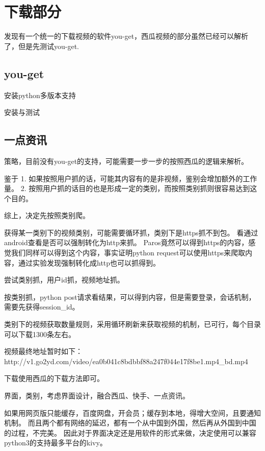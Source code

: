 \documentclass[11pt]{article}
\begin{document}
    \section{下载部分}\label{ux4e0bux8f7dux90e8ux5206}

发现有一个统一的下载视频的软件you-get，西瓜视频的部分虽然已经可以解析了，但是先测试you-get.

\subsection{you-get}\label{you-get}

安装python多版本支持

安装与测试

    \subsection{一点资讯}\label{ux4e00ux70b9ux8d44ux8baf}

策略，目前没有you-get的支持，可能需要一步一步的按照西瓜的逻辑来解析。

鉴于 1.
如果按照用户抓的话，可能其内容有的是非视频，鉴别会增加额外的工作量。 2.
按照用户抓的话目的也是形成一定的类别，而按照类别抓则很容易达到这个目的。

综上，决定先按照类别爬。

获得某一类别下的视频类别，可能需要循环抓，类别下是https抓不到包。
看通过android查看是否可以强制转化为http来抓。
Paros竟然可以得到https的内容，感觉我们同样可以得到这个内容，事实证明python
request可以使用https来爬取内容，通过实验发现强制转化成http也可以抓得到。

尝试类别抓，用户id抓，视频地址抓。

按类别抓，python
post请求看结果，可以得到内容，但是需要登录，会话机制，需要先获得session\_id。

类别下的视频获取数量规则，采用循环刷新来获取视频的机制，已可行，每个目录可以下载1300条左右。

视频最终地址暂时如下：
http://v1.go2yd.com/video/ea0b041c8bdbbf88a247f044e17f8be1.mp4\_bd.mp4

下载使用西瓜的下载方法即可。

界面，类别，考虑界面设计，融合西瓜、快手、一点资讯。

如果用网页版只能缓存，百度网盘，开会员；缓存到本地，得增大空间，且要通知机制。
而且两个都有网络的延迟，都有一个从中国到外国，然后再从外国到中国的过程，不完美。
因此对于界面决定还是用软件的形式来做，决定使用可以兼容python3的支持最多平台的kivy。
\end{document}
